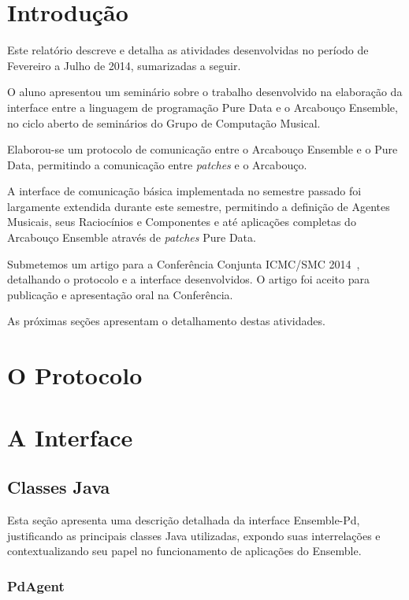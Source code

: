 \documentclass[a4paper, 11pt, twoside]{article}
\begin{document}
\begin{multicols}{2}

\section{Introdução}

Este relatório descreve e detalha as atividades desenvolvidas no período de 
Fevereiro a Julho de 2014, sumarizadas a seguir.

O aluno apresentou um seminário sobre o trabalho desenvolvido na elaboração da 
interface entre a linguagem de programação Pure Data e o Arcabouço Ensemble, 
no ciclo aberto de seminários do Grupo de Computação Musical.

Elaborou-se um protocolo de comunicação entre o Arcabouço Ensemble e o
Pure Data, permitindo a comunicação entre \textit{patches} e o Arcabouço.

A interface de comunicação básica implementada no semestre passado foi
largamente extendida durante este semestre, permitindo a definição de
Agentes Musicais, seus Raciocínios e Componentes e até aplicações
completas do Arcabouço Ensemble através de \textit{patches} Pure Data.

Submetemos um artigo para a Conferência Conjunta ICMC/SMC 2014~\cite{},
detalhando o protocolo e a interface desenvolvidos. O artigo foi aceito
para publicação e apresentação oral na Conferência.

As próximas seções apresentam o detalhamento destas atividades.

\section{O Protocolo}

\section{A Interface}

\subsection{Classes Java}

Esta seção apresenta uma descrição detalhada da interface Ensemble-Pd,
justificando as principais classes Java utilizadas, expondo suas 
interrelações e contextualizando seu papel no funcionamento de aplicações
do Ensemble.

\subsubsection{PdAgent}


\end{multicols}
\end{document}
